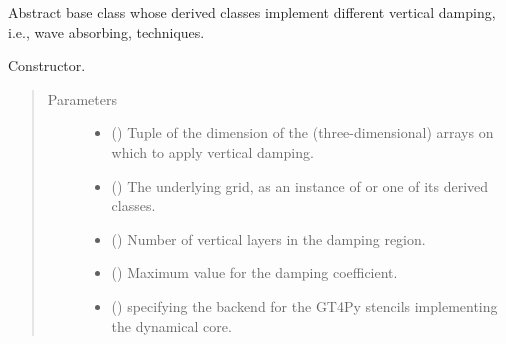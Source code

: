 \documentclass[letterpaper,10pt,english]{sphinxmanual}
\begin{document}
\begin{fulllineitems}
\label{\detokenize{api:tasmania.dycore.vertical_damping.VerticalDamping}}
Abstract base class whose derived classes implement different vertical damping, i.e., wave absorbing, techniques.

\begin{fulllineitems}
\label{\detokenize{api:tasmania.dycore.vertical_damping.VerticalDamping.__init__}}
Constructor.
\begin{quote}\begin{description}
\item[{Parameters}] \leavevmode\begin{itemize}
\item {} 
 () \textendash{} Tuple of the dimension of the (three-dimensional) arrays on which to apply vertical damping.

\item {} 
 () \textendash{} The underlying grid, as an instance of {\hyperref[\detokenize{api:tasmania.grids.grid_xyz.GridXYZ}]{}} or one of its derived classes.

\item {} 
 () \textendash{} Number of vertical layers in the damping region.

\item {} 
 () \textendash{} Maximum value for the damping coefficient.

\item {} 
 () \textendash{}  specifying the backend for the GT4Py stencils implementing the dynamical core.

\end{itemize}

\end{description}\end{quote}


\end{fulllineitems}
\end{fulllineitems}
\end{document}

